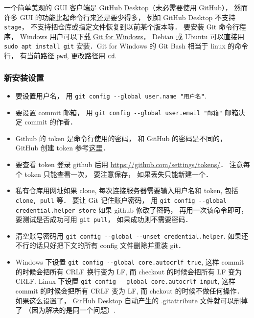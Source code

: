 

一个简单美观的 GUI 客户端是 GitHub Desktop（未必需要使用 GitHub）， 然而许多 GUI 的功能比起命令行来还是要少得多， 例如 GitHub Desktop 不支持 \verb|stage|， 不支持把仓库或指定文件恢复到以前某个版本等． 要安装 Git 命令行程序， Windows 用户可以下载 \href{https://gitforwindows.org/}{Git for Windows}， Debian 或 Ubuntu 可以直接用 \verb|sudo apt install git| 安装．Git for Windows 的 Git Bash 相当于 linux 的命令行， 有当前路径 \verb|pwd|, 更改路径用 \verb|cd|.

\subsubsection{新安装设置}
\begin{itemize}
\item 要设置用户名， 用 \verb|git config --global user.name "用户名"|.
\item 要设置 commit 邮箱， 用 \verb|git config --global user.email "邮箱"|  邮箱决定 commit 的作者．
\item Github 的 token 是命令行使用的密码， 和 GitHub 的密码是不同的， GitHub 创建 token 参考\href{https://docs.github.com/en/github/authenticating-to-github/keeping-your-account-and-data-secure/creating-a-personal-access-token#creating-a-token}{这里}．
\item 要查看 token 登录 github 后用 \href{https://github.com/settings/tokens/}{https://github.com/settings/tokens/}． 注意每个 token 只能查看一次， 要注意保存， 如果丢失只能新建一个．
\item 私有仓库用网址如果 clone, 每次连接服务器需要输入用户名和 token, 包括 \verb|clone, pull| 等． 要让 Git 记住账户密码， 用 \verb|git config --global credential.helper store| 如果 github 修改了密码， 再用一次该命令即可， 要测试是否成功可用 \verb|git pull|， 如果成功则不需要密码．
\item 清空账号密码用 \verb|git config --global --unset credential.helper|. 如果还不行的话只好把下文的所有 config 文件删除并重装 git．
\item Windows 下设置 \verb|git config --global core.autocrlf true|, 这样 commit 的时候会把所有 CRLF 换行变为 LF, 而 checkout 的时候会把所有 LF 变为 CRLF. Linux 下设置 \verb|git config --global core.autocrlf input|, 这样 commit 的时候会把所有 CRLF 变为 LF, 而 chekout 的时候不做任何操作． 如果这么设置了， GitHub Desktop 自动产生的 .gitattribute 文件就可以删掉了 （因为解决的是同一个问题）.

\end{itemize}
